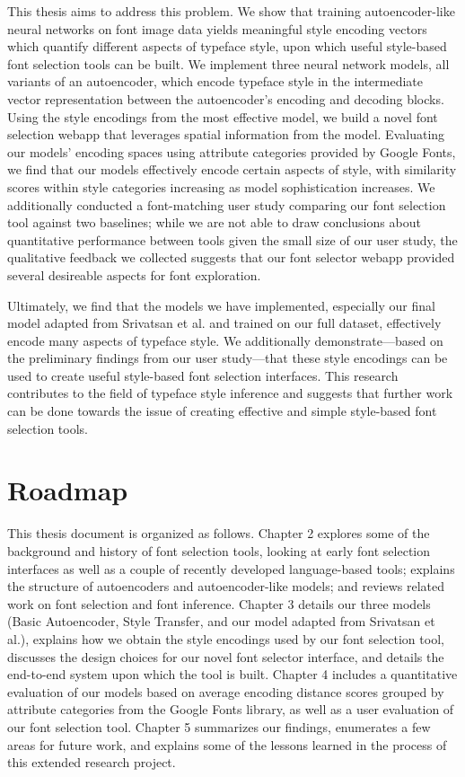 This thesis aims to address this problem. We show that training autoencoder-like neural networks on font image data yields meaningful style encoding vectors which quantify different aspects of typeface style, upon which useful style-based font selection tools can be built. We implement three neural network models, all variants of an autoencoder, which encode typeface style in the intermediate vector representation between the autoencoder's encoding and decoding blocks. Using the style encodings from the most effective model, we build a novel font selection webapp that leverages spatial information from the model. Evaluating our models' encoding spaces using attribute categories provided by Google Fonts, we find that our models effectively encode certain aspects of style, with similarity scores within style categories increasing as model sophistication increases. We additionally conducted a font-matching user study comparing our font selection tool against two baselines; while we are not able to draw conclusions about quantitative performance between tools given the small size of our user study, the qualitative feedback we collected suggests that our font selector webapp provided several desireable aspects for font exploration.

Ultimately, we find that the models we have implemented, especially our final model adapted from Srivatsan et al. \cite{srivatsan2020} and trained on our full dataset, effectively encode many aspects of typeface style. We additionally demonstrate---based on the preliminary findings from our user study---that these style encodings can be used to create useful style-based font selection interfaces. This research contributes to the field of typeface style inference and suggests that further work can be done towards the issue of creating effective and simple style-based font selection tools.

\section{Roadmap}

This thesis document is organized as follows. Chapter 2 explores some of the background and history of font selection tools, looking at early font selection interfaces as well as a couple of recently developed language-based tools; explains the structure of autoencoders and autoencoder-like models; and reviews related work on font selection and font inference. Chapter 3 details our three models (Basic Autoencoder, Style Transfer, and our model adapted from Srivatsan et al.), explains how we obtain the style encodings used by our font selection tool, discusses the design choices for our novel font selector interface, and details the end-to-end system upon which the tool is built. Chapter 4 includes a quantitative evaluation of our models based on average encoding distance scores grouped by attribute categories from the Google Fonts library, as well as a user evaluation of our font selection tool. Chapter 5 summarizes our findings, enumerates a few areas for future work, and explains some of the lessons learned in the process of this extended research project.